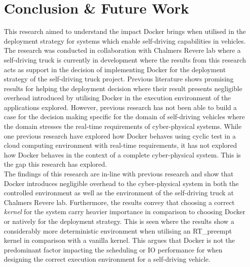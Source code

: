 \iffalse  \fi
\chapter{Conclusion \& Future Work} \label{section:conclusion}

This research aimed to understand the impact Docker brings when utilised in the deployment strategy for systems which enable self-driving capabilities in vehicles. The research was conducted in collaboration with Chalmers Revere lab where a self-driving truck is currently in development where the results from this research acts as support in the decision of implementing Docker for the deployment strategy of the self-driving truck project. Previous literature \cite{p6,c2,p3,p4,p7,c1} shows promising results for helping the deployment decision where their result presents negligible overhead introduced by utilising Docker in the execution environment of the applications explored. However, previous research has not been able to build a case for the decision making specific for the domain of self-driving vehicles where the domain stresses the real-time requirements of cyber-physical systems. While one previous research \cite{p1} have explored how Docker behaves using cyclic test in a cloud computing environment with real-time requirements, it has not explored how Docker behaves in the context of a complete cyber-physical system. This is the gap this research has explored.\\

The findings of this research are in-line with previous research and show that Docker introduces negligible overhead to the cyber-physical system in both the controlled environment as well as the environment of the self-driving truck at Chalmers Revere lab. Furthermore, the results convey that choosing a correct \textit{kernel} for the system carry heavier importance in comparison to choosing Docker or natively for the deployment strategy. This is seen where the results show a considerably more deterministic environment when utilising an RT\_preempt kernel in comparison with a vanilla kernel. This argues that Docker is not the predominant factor impacting the scheduling or IO performance for when designing the correct execution environment for a self-driving vehicle.\\

